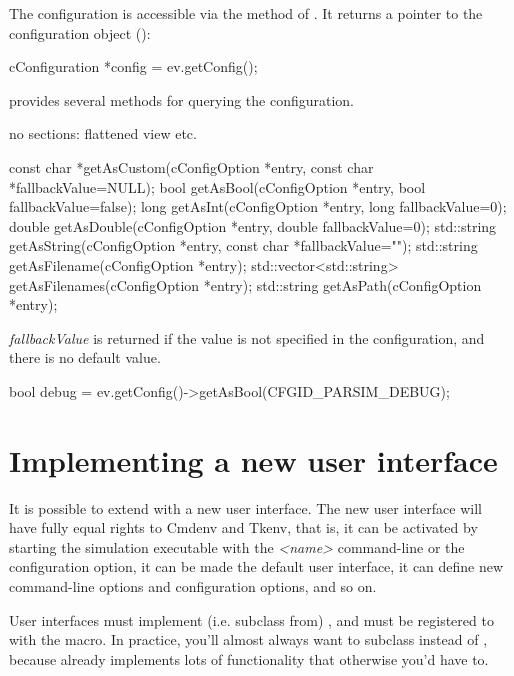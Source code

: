 The configuration is accessible via the  method of .
It returns a pointer to the configuration object ():

\begin{cpp}
cConfiguration *config = ev.getConfig();
\end{cpp}

 provides several methods for querying the configuration.

no sections: flattened view etc.

\begin{cpp}
const char *getAsCustom(cConfigOption *entry, const char *fallbackValue=NULL);
bool getAsBool(cConfigOption *entry, bool fallbackValue=false);
long getAsInt(cConfigOption *entry, long fallbackValue=0);
double getAsDouble(cConfigOption *entry, double fallbackValue=0);
std::string getAsString(cConfigOption *entry, const char *fallbackValue="");
std::string getAsFilename(cConfigOption *entry);
std::vector<std::string> getAsFilenames(cConfigOption *entry);
std::string getAsPath(cConfigOption *entry);
\end{cpp}

\textit{fallbackValue} is returned if the value is not specified in the configuration,
and there is no default value.

\begin{cpp}
bool debug = ev.getConfig()->getAsBool(CFGID_PARSIM_DEBUG);
\end{cpp}


\section{Implementing a new user interface}
\label{sec:plugin-exts:userinterface}

It is possible to extend {\opp} with a new user interface. The new
user interface will have fully equal rights to Cmdenv and Tkenv, that is,
it can be activated by starting the simulation executable with the
 \textit{<name>} command-line or the 
configuration option, it can be made the default user interface,
it can define new command-line options and configuration options,
and so on.

User interfaces must implement (i.e. subclass from) ,
and must be registered to {\opp} with the  macro.
In practice, you'll almost always want to subclass 
instead of , because  already
implements lots of functionality that otherwise you'd have to.

